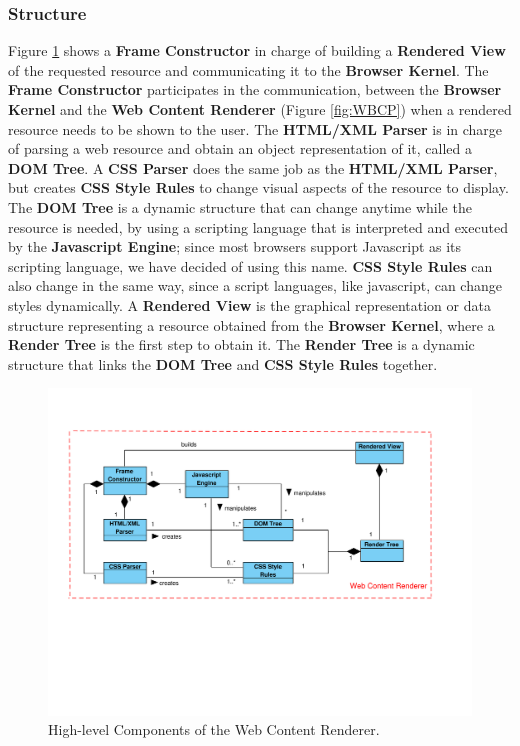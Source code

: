 \documentclass[prodmode,acmtecs]{acmsmall}
\begin{document}
    \subsubsection*{Structure}
    Figure \ref{fig:WCR} shows a \textbf{Frame Constructor} in charge of building a \textbf{Rendered View} of the requested resource and communicating it to the \textbf{Browser Kernel}. The \textbf{Frame Constructor} participates in the communication, between the \textbf{Browser Kernel} and the \textbf{Web Content Renderer} (Figure \ref{fig:WBCP}) when a rendered resource needs to be shown to the user. The \textbf{HTML/XML Parser} is in charge of parsing a web resource and obtain an object representation of it, called a \textbf{DOM Tree}. A \textbf{CSS Parser} does the same job as the \textbf{HTML/XML Parser}, but creates \textbf{CSS Style Rules} to change visual aspects of the resource to display. The \textbf{DOM Tree} is a dynamic structure that can change anytime while the resource is needed, by using a scripting language that is interpreted and executed by the \textbf{Javascript Engine}; since most browsers support Javascript as its scripting language, we have decided of using this name. \textbf{CSS Style Rules} can also change in the same way, since a script languages, like javascript, can change styles dynamically. A \textbf{Rendered View} is the graphical representation or data structure representing a resource obtained from the \textbf{Browser Kernel}, where a \textbf{Render Tree} is the first step to obtain it. The \textbf{Render Tree} is a dynamic structure that links the \textbf{DOM Tree} and \textbf{CSS Style Rules} together.

    \begin{figure}[h!t]
      \centering
      \hspace*{-0.4cm}\includegraphics[scale=0.57]{figures/WebContentRenderer-v2.pdf}
      \vspace*{-3.8cm}
      \caption{High-level Components of the Web Content Renderer.}
      \label{fig:WCR}
    \end{figure}
\end{document}
